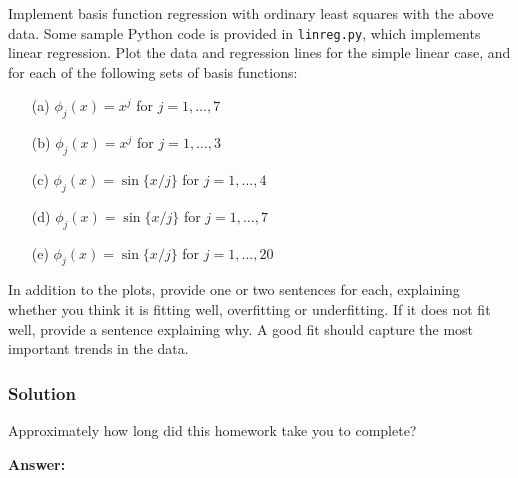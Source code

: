 \documentclass[submit]{harvardml}
\begin{document}
\begin{problem}
Implement basis function regression with ordinary least squares with the above
data. Some sample Python code is provided in \verb|linreg.py|, which implements
linear regression.  Plot the data and regression lines for the simple linear
case, and for each of the following sets of basis functions:
\begin{itemize}
	\item[(a)] $\phi_j(x) = x^j$ for $j=1, \ldots, 7$
	\item[(b)] $\phi_j(x) = x^j$ for $j=1, \ldots, 3$
	\item[(c)] $\phi_j(x) = \sin\{ x / j \}$ for $j=1, \ldots, 4$
	\item[(d)] $\phi_j(x) = \sin\{ x / j \}$ for $j=1, \ldots, 7$
	\item[(e)] $\phi_j(x) = \sin\{ x / j \}$ for $j=1, \ldots, 20$
\end{itemize}
  In addition to the plots, provide one or two sentences for each, explaining
  whether you think it is fitting well, overfitting or underfitting.  If it does
  not fit well, provide a sentence explaining why. A good fit should capture the
  most important trends in the data.
	\end{problem}

\subsubsection*{Solution}











\newpage
\begin{problem}[Calibration, 1pt]
Approximately how long did this homework take you to complete?
\end{problem}
\textbf{Answer:}
\end{document}
